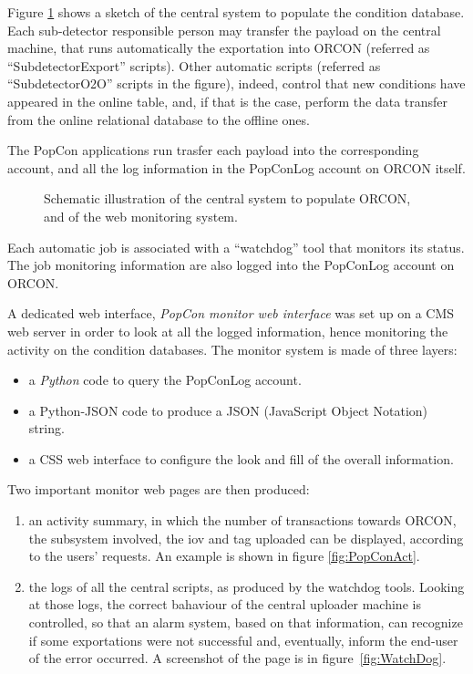 \documentclass[a4paper]{jpconf}
\begin{document}
Figure \ref{fig:DropBox} shows a sketch of the central system to populate the condition database. Each sub-detector responsible person may transfer the payload on the central machine, that runs automatically the exportation into ORCON (referred as  ``SubdetectorExport'' scripts). Other automatic scripts (referred as ``SubdetectorO2O'' scripts in the figure), indeed, control that new conditions have appeared in the online table, and, if that is the case, perform the data transfer from the online relational database to the offline ones.   

The PopCon applications run trasfer each payload into the corresponding account, and all the log information in the PopConLog account on ORCON itself.

\begin{figure}[hbtp]
  \begin{center}
     \caption{Schematic illustration of the central system to populate ORCON, and of the web monitoring system.}
    \label{fig:DropBox}
  \end{center}
\end{figure}

Each automatic job is associated with a ``watchdog'' tool that monitors its status.
The job monitoring information are also logged into the PopConLog account on ORCON.

A dedicated web interface, {\it PopCon monitor web interface} was set up on a CMS web server in order to look at all the logged information, hence monitoring the activity on the condition databases. 
The monitor system is made of three layers:
\begin{itemize}
\item a {\it Python} code to query the PopConLog account.   
\item a Python-JSON code to produce a JSON (JavaScript Object Notation) string. 
\item a CSS web interface to configure the look and fill of the overall information.
\end{itemize} 

Two important monitor web pages are then produced:
\begin{enumerate}
\item an activity summary, in which the number of transactions towards ORCON, the subsystem involved, the iov and tag uploaded can be displayed, according to the users' requests. An example is shown in figure \ref{fig:PopConAct}. 
\item the logs of all the central scripts, as produced by the watchdog tools. Looking at those logs, the correct bahaviour of the central uploader machine is controlled, so that an alarm system, based on that information, can recognize if some exportations were not successful and, eventually, inform the end-user of the error occurred. A screenshot of the page is in figure~\ref{fig:WatchDog}.    
\end{enumerate}
\end{document}
